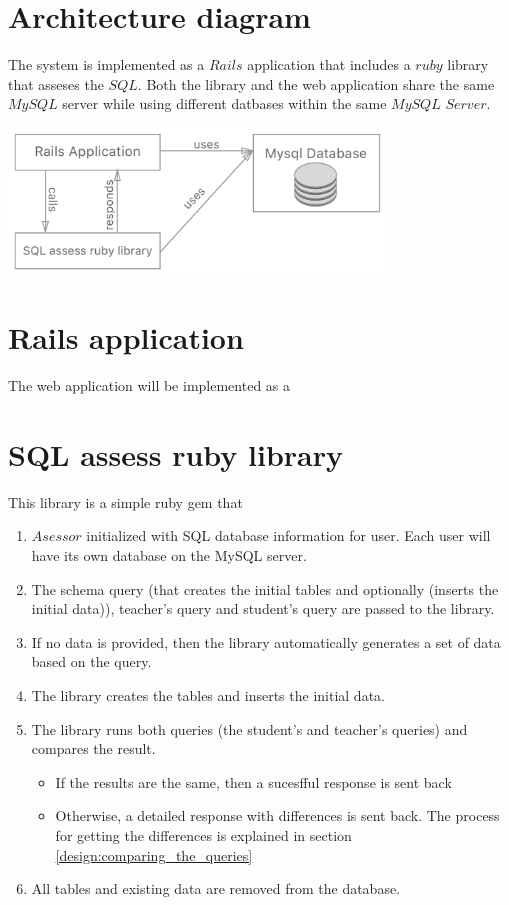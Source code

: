 \section{Architecture diagram}
The system is implemented as a $Rails$ application that includes a $ruby$ library
that asseses the $SQL$. Both the library and the web application share
the same $MySQL$ server while using different datbases within the same $MySQL$
$Server$.
\begin{center}
    \includegraphics[width=100mm]{images/design/arhitecture.png}
\end{center}

\section{Rails application}
The web application will be implemented as a
\section{SQL assess ruby library}
This library is a simple ruby gem that
\begin{enumerate}
    \item $Asessor$ initialized with SQL database information for user. Each user
    will have its own database on the MySQL server.
    \item The schema query (that creates the initial tables and optionally (inserts the
    initial data)), teacher's query and student's query are passed to the library.
    \item If no data is provided, then the library automatically generates a set
    of data based on the query.
    \item The library creates the tables and inserts the initial data.
    \item The library runs both queries (the student's and teacher's queries)
    and compares the result.
    \begin{itemize}
        \item If the results are the same, then a sucesfful response is sent back
        \item Otherwise, a detailed response with differences is sent back. The process
        for getting the differences is explained in section \ref{design:comparing_the_queries}
    \end{itemize}
    \item All tables and existing data are removed from the database.
\end{enumerate}
